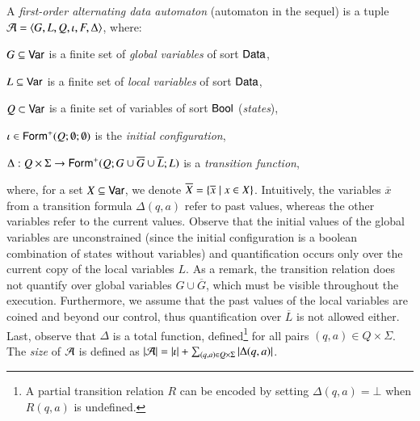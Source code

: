 \documentclass{llncs}
\begin{document}
A \emph{first-order alternating data automaton} (automaton in the
sequel) is a tuple $\mathcal{A} = \langle G,L,Q,\iota,F,\Delta \rangle$,
where: \begin{compactitem}
%
\item $G \subseteq \mathsf{Var}$ is a finite set of \emph{global
  variables} of sort $\mathsf{Data}$, 
%
\item $L \subseteq \mathsf{Var}$ is a finite set of \emph{local
  variables} of sort $\mathsf{Data}$,
%
\item $Q \subset \mathsf{Var}$ is a finite set of variables of sort $\mathsf{Bool}$
  (\emph{states}),
%
\item $\iota \in \mathsf{Form}^+(Q;\emptyset;\emptyset)$ is the \emph{initial
  configuration},
%
\item $\Delta : Q \times \Sigma \rightarrow
  \mathsf{Form}^+(Q;G\cup\overline{G}\cup\overline{L};L)$ is a
  \emph{transition function},
\end{compactitem}
where, for a set $X \subseteq \mathsf{Var}$, we denote $\overline{X} =
\{ \overline{x} \mid x \in X \}$. Intuitively, the variables
$\overline{x}$ from a transition formula $\Delta(q,a)$ refer to past
values, whereas the other variables refer to the current
values. Observe that the initial values of the global variables are
unconstrained (since the initial configuration is a boolean
combination of states without variables) and quantification occurs
only over the current copy of the local variables $L$. As a remark,
the transition relation does not quantify over global variables $G
\cup \overline{G}$, which must be visible throughout the
execution. Furthermore, we assume that the past values of the local
variables are coined and beyond our control, thus quantification over
$\overline{L}$ is not allowed either. Last, observe that $\Delta$ is a
total function, defined\footnote{A partial transition relation $R$ can
  be encoded by setting $\Delta(q,a) = \bot$ when $R(q,a)$ is
  undefined.} for all pairs $(q,a) \in Q \times \Sigma$. The
\emph{size} of $\mathcal{A}$ is defined as ${|{\mathcal{A}}|} = {|{\iota}|} +
\sum_{(q,a) \in Q\times\Sigma}{|{\Delta(q,a)}|}$.
\end{document}
